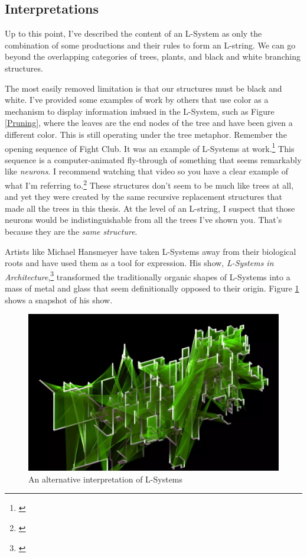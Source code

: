 \documentclass[12pt,twoside]{reedthesis}
\begin{document}
	\subsection{Interpretations}
	\label{Interpretations}
	
	Up to this point, I've described the content of an L-System as only the combination of some productions and their rules to form an L-string. We can go beyond the overlapping categories of trees, plants, and black and white branching structures.
	
	The most easily removed limitation is that our structures must be black and white. I've provided some examples of work by others that use color as a mechanism to display information imbued in the L-System, such as Figure \ref{Pruning}, where the leaves are the end nodes of the tree and have been given a different color. This is still operating under the tree metaphor. Remember the opening sequence of Fight Club. It was an example of L-Systems at work.\footnote{\cite{FightClub1999}} This sequence is a computer-animated fly-through of something that seems remarkably like \textit{neurons}. I recommend watching that video so you have a clear example of what I'm referring to.\footnote{\cite{FightClubVid}} These structures don't seem to be much like trees at all, and yet they were created by the same recursive replacement structures that made all the trees in this thesis. At the level of an L-string, I suspect that those neurons would be indistinguishable from all the trees I've shown you. That's because they are the \textit{same structure}.
	
	Artists like Michael Hansmeyer have taken L-Systems away from their biological roots and have used them as a tool for expression. His show, \textit{L-Systems in Architecture},\footnote{\cite{hansmeyer2003}} transformed the traditionally organic shapes of L-Systems into a mass of metal and glass that seem definitionally opposed to their origin. Figure \ref{Hansmeyer} shows a snapshot of his show.
	
	\begin{figure}[h]
	\centering
	\includegraphics[width=0.8\linewidth]{Images/Hansmeyer}
	\caption{An alternative interpretation of L-Systems}
	\label{Hansmeyer}
	\end{figure}
	
\end{document}
